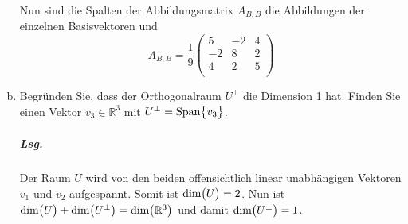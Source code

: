 \documentclass{scrreprt}
\begin{document}
\begin{enumerate}[(a)]
  Nun sind die Spalten der Abbildungsmatrix $A_{B, B}$ die Abbildungen der
  einzelnen Basisvektoren und
  \[
    A_{B, B} = \frac{1}{9}\begin{pmatrix}
      5  & -2 & 4 \\
      -2 & 8  & 2 \\
      4  & 2  & 5 \\
    \end{pmatrix}
  \]

\item Begründen Sie, dass der Orthogonalraum $U^{\bot}$ die Dimension 1 hat.
  Finden Sie einen Vektor $v_3 \in \mathbb{R}^3$ mit
  $U^{\bot} = \text{Span}\qty\big{v_3}$.

  \subparagraph{Lsg.} Der Raum $U$ wird von den beiden offensichtlich linear
  unabhängigen Vektoren $v_1$ und $v_2$ aufgespannt.
  Somit ist $\text{dim}\qty\big(U) = 2$.
  Nun ist $\text{dim}\qty\big(U) + \text{dim}\qty\big(U^{\bot})
  = \text{dim}\qty\big(\mathbb{R}^3)$ und damit
  $\text{dim}\qty\big(U^{\bot}) = 1$.


\end{enumerate}
\end{document}
